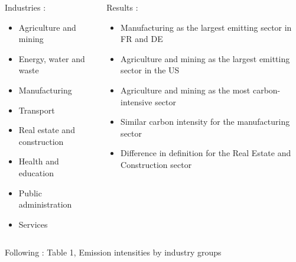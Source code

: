 \documentclass[10pt]{beamer}
\newcommand\ReduceFont{\fontsize{10}{7.2}\selectfont}
\begin{document}
\begin{frame}{\subsecname}
    \begin{columns}
        \begin{column}{0.5\textwidth}
            Industries :
                \begin{itemize}
                    \item Agriculture and mining
                    \item Energy, water and waste
                    \item Manufacturing
                    \item Transport
                    \item Real estate and construction
                    \item Health and education
                    \item Public administration
                    \item Services
                \end{itemize}
        \end{column}
        \begin{column}{0.5\textwidth}
            \ReduceFont
            Results : 
                \begin{itemize}
                    \item Manufacturing as the largest emitting sector in FR and DE
                    \item Agriculture and mining as the largest emitting sector in the US
                    \item Agriculture and mining as the most carbon-intensive sector
                    \item Similar carbon intensity for the manufacturing sector
                    \item Difference in definition for the Real Estate and Construction sector
                \end{itemize}    
        \end{column}
    \end{columns}
    \hfill \break
    Following : Table 1, Emission intensities by industry groups
\end{frame}
\end{document}
